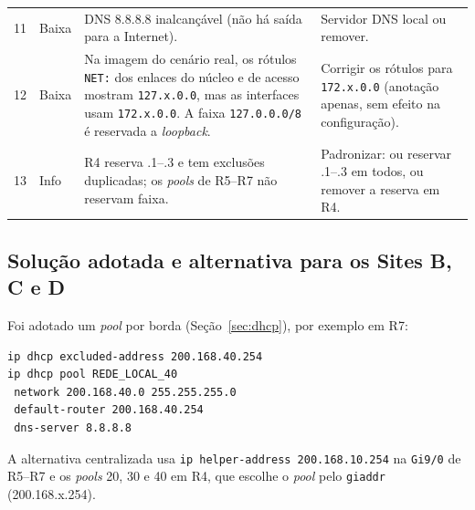 \documentclass[12pt,a4paper]{article}
\begin{document}
\begin{longtable}{@{}p{0.6cm}p{2cm}p{5.2cm}p{6.2cm}@{}}
11 & Baixa & DNS 8.8.8.8 inalcançável (não há saída para a Internet). & Servidor DNS local ou remover.\\
12 & Baixa & Na imagem do cenário real, os rótulos \texttt{NET:} dos enlaces do núcleo e de acesso mostram \texttt{127.x.0.0}, mas as interfaces usam \texttt{172.x.0.0}. A faixa \texttt{127.0.0.0/8} é reservada a \textit{loopback}. & Corrigir os rótulos para \texttt{172.x.0.0} (anotação apenas, sem efeito na configuração).\\
13 & Info & R4 reserva .1--.3 e tem exclusões duplicadas; os \textit{pools} de R5--R7 não reservam faixa. & Padronizar: ou reservar .1--.3 em todos, ou remover a reserva em R4.\\\bottomrule
\end{longtable}

\subsection{Solução adotada e alternativa para os Sites B, C e D}
Foi adotado um \textit{pool} por borda (Seção~\ref{sec:dhcp}), por exemplo em R7:
\begin{lstlisting}
ip dhcp excluded-address 200.168.40.254
ip dhcp pool REDE_LOCAL_40
 network 200.168.40.0 255.255.255.0
 default-router 200.168.40.254
 dns-server 8.8.8.8
\end{lstlisting}
A alternativa centralizada usa \texttt{ip helper-address 200.168.10.254} na \texttt{Gi9/0} de R5--R7 e os \textit{pools} 20, 30 e 40 em R4, que escolhe o \textit{pool} pelo \texttt{giaddr} (200.168.x.254).

\end{document}
